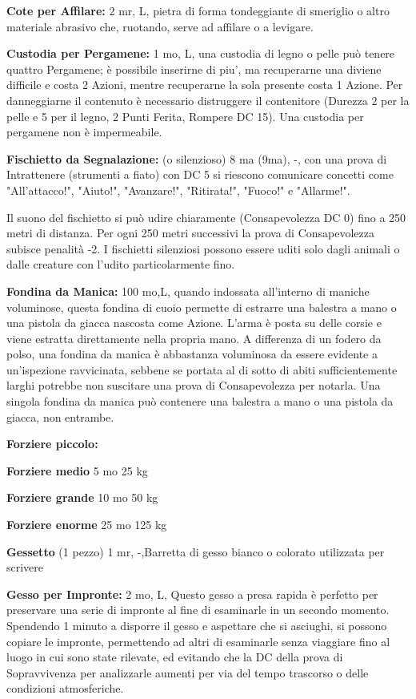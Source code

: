 \documentclass[a4paper,11pt,twoside,openany]{book}
\begin{document}
{\textbf{Cote per Affilare:} 2 mr, L, pietra di forma tondeggiante di smeriglio o altro materiale abrasivo che, ruotando, serve ad affilare o a levigare.

\textbf{Custodia per Pergamene:} 1 mo, L, una custodia di legno o pelle può tenere quattro Pergamene; è possibile inserirne di piu', ma recuperarne una diviene difficile e costa 2 Azioni, mentre recuperarne la sola presente costa 1 Azione. Per danneggiarne il contenuto è necessario distruggere il contenitore (Durezza 2 per la pelle e 5 per il legno, 2 Punti Ferita, Rompere DC 15). Una custodia per pergamene non è impermeabile.

\textbf{Fischietto da Segnalazione:} (o silenzioso) 8 ma (9ma), -, con una prova di Intrattenere (strumenti a fiato) con DC 5 si riescono comunicare concetti come "All'attacco!", "Aiuto!", "Avanzare!", "Ritirata!", "Fuoco!" e "Allarme!".

Il suono del fischietto si può udire chiaramente (Consapevolezza DC 0) fino a 250 metri di distanza. Per ogni 250 metri successivi la prova di Consapevolezza subisce penalità -2. I fischietti silenziosi possono essere uditi solo dagli animali o dalle creature con l'udito particolarmente fino.

\textbf{Fondina da Manica:} 100 mo,L, quando indossata all'interno di maniche voluminose, questa fondina di cuoio permette di estrarre una balestra a mano o una pistola da giacca nascosta come Azione. L'arma è posta su delle corsie e viene estratta direttamente nella propria mano.
A differenza di un fodero da polso, una fondina da manica è abbastanza voluminosa da essere evidente a un'ispezione ravvicinata, sebbene se portata al di sotto di abiti sufficientemente larghi potrebbe non suscitare una prova di Consapevolezza per notarla. Una singola fondina da manica può contenere una balestra a mano o una pistola da giacca, non entrambe.

\textbf{Forziere piccolo:}

\textbf{Forziere medio} 5 mo 25 kg

\textbf{Forziere grande} 10 mo 50 kg

\textbf{Forziere enorme} 25 mo 125 kg

\textbf{Gessetto} (1 pezzo) 1 mr, -,Barretta di gesso bianco o colorato utilizzata per scrivere

\textbf{Gesso per Impronte:} 2 mo, L, Questo gesso a presa rapida è perfetto per preservare una serie di impronte al fine di esaminarle in un secondo momento. Spendendo 1 minuto a disporre il gesso e aspettare che si asciughi, si possono copiare le impronte, permettendo ad altri di esaminarle senza viaggiare fino al luogo in cui sono state rilevate, ed evitando che la DC della prova di Sopravvivenza per analizzarle aumenti per via del tempo trascorso o delle condizioni atmosferiche. 

}
\end{document}
